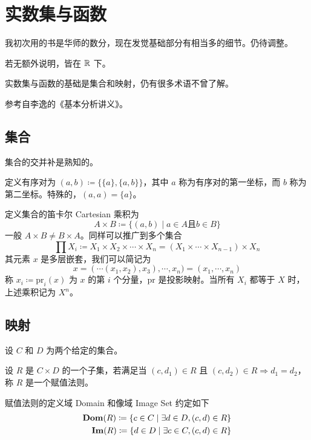 
\chapter{实数集与函数}

我初次用的书是华师的数分，现在发觉基础部分有相当多的细节。仍待调整。

若无额外说明，皆在 $\mathbb{R}$ 下。

实数集与函数的基础是集合和映射，仍有很多术语不曾了解。

参考自李逸的《基本分析讲义》。

\section{集合}

集合的交并补是熟知的。

定义有序对为 $(a,b) \coloneqq  \{\{a\},\{a,b\}\}$，其中 $a$ 称为有序对的第一坐标，而 $b$ 称为第二坐标。特殊的，$(a,a) = \{a\}$。

定义集合的笛卡尔 Cartesian 乘积为
$$A \times B \coloneqq  \{(a,b) \mid a\in A \text{且} b\in B\}$$
一般 $A \times B \ne B \times A$。同样可以推广到多个集合
$$\prod X_i \coloneqq  X_1 \times X_2 \times \cdots \times X_n = (X_1 \times \cdots \times X_{n-1}) \times X_n$$
其元素 $x$ 是多层嵌套，我们可以简记为
$$x = (\cdots(x_1,x_2),x_3),\cdots,x_n) = (x_1,\cdots,x_n)$$
称 $x_i \coloneqq  \mathrm{pr}_i(x)$ 为 $x$ 的第 $i$ 个分量，$\mathrm{pr}$ 是投影映射。当所有 $X_i$ 都等于 $X$ 时，上述乘积记为 $X^n$。

\section{映射}

设 $C$ 和 $D$ 为两个给定的集合。

\begin{definition}[赋值法则]
	设 $R$ 是 $C\times D$ 的一个子集，若满足当 $(c,d_1)\in R$ 且 $(c,d_2)\in R \Rightarrow d_1=d_2$，称 $R$ 是一个赋值法则。
\end{definition}

赋值法则的定义域 Domain 和像域 Image Set 约定如下
\begin{equation*}
	\begin{aligned}
		\operatorname{\mathbf{Dom}}(R) \coloneqq  \{c\in C \mid \exists d \in D, (c,d) \in R\}\\
		\operatorname{\mathbf{Im}}(R) \coloneqq  \{d\in D \mid \exists c \in C, (c,d) \in R\}\\
	\end{aligned}
\end{equation*}

